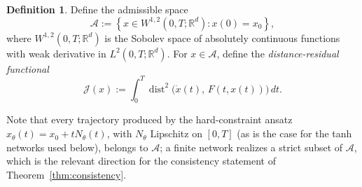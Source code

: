 \documentclass[11pt]{elsarticle}
\theoremstyle{definition}
\newtheorem{definition}[theorem]{Definition}
\theoremstyle{remark}
\numberwithin{equation}{section}
\def\dist{\operatorname{dist}}
\begin{document}
	\begin{definition}\label{def:admissible-class}
		Define the admissible space
		\[
		\mathcal{A}:= \left\{ x \in W^{1,2}(0,T; \mathbb{R}^d) : x(0) = x_0 \right\},
		\]
		where $W^{1,2}(0,T; \mathbb{R}^d)$ is the Sobolev space of absolutely 
		continuous functions with weak derivative in $L^2(0,T; \mathbb{R}^d)$.
		For $x\in\mathcal{A}$, define the \emph{distance-residual functional}
		\begin{equation}\label{eq:cont-functional}
			\mathcal{J}(x)
			:=
			\int_0^T\dist^2\bigl(\dot{x}(t),\,F(t,x(t))\bigr)\,dt.
		\end{equation}
	\end{definition}
	
	Note that every trajectory produced by the hard-constraint ansatz
	$x_\theta(t)=x_0+tN_\theta(t)$, with $N_\theta$ Lipschitz on $[0,T]$
	(as is the case for the tanh networks used below), belongs to
	$\mathcal{A}$; a finite network realizes a strict subset of
	$\mathcal{A}$, which is the relevant direction for the consistency
	statement of Theorem~\ref{thm:consistency}.
	
\end{document}
